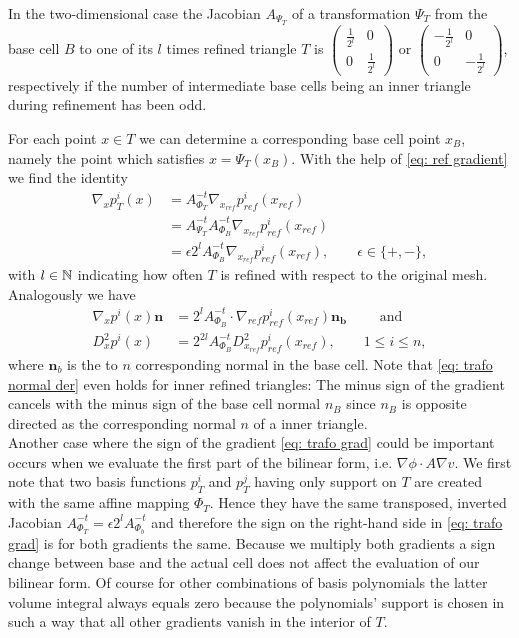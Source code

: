 \begin{example}\label{ex: leaf cell trafo}
In the two-dimensional case the Jacobian $A_{\Psi_T}$ of a transformation $\Psi_T$ from the base cell $B$ to one of its $l$ times refined triangle $T$ is $
	\begin{pmatrix}
		\frac 1 {2^l} & 0 \\ 0 & \frac 1 {2^l}
	\end{pmatrix} \text{ or }
	\begin{pmatrix}
		-\frac 1 {2^l} & 0 \\ 0 & -\frac 1 {2^l}
	\end{pmatrix}$, respectively if the number of intermediate base cells being an inner triangle during refinement  has been odd.

 For each point $x \in T$ we can determine a corresponding base cell point $x_B$, namely the point which satisfies $x = \Psi_T(x_B)$. With the help of \eqref{eq: ref gradient} we find the identity
\begin{align}
\nabla_x p_T^i(x) &= A_{\Phi_T}^{-t} \nabla_{x_{ref}} p^i_{ref} (x_{ref}) \nonumber\\
 &= A_{\Psi_T}^{-t} A_{\Phi_B}^{-t} \nabla_{x_{ref}} p^i_{ref} (x_{ref}) \nonumber\\
&= \epsilon 2^l A_{\Phi_B}^{-t} \nabla_{x_{ref}} p^i_{ref}(x_{ref}), \qquad \epsilon \in \{+,-\} \label{eq: trafo grad},
\end{align}
with $l \in \mathbb{N}$ indicating how often $T$ is refined with respect to the original mesh.\\
Analogously we have
\begin{align}
\nabla_x p^i(x) \mathbf n &= 2^l  A_{\Phi_B}^{-t} \cdot \nabla_{ref}p^i_{ref}(x_{ref}) \mathbf{ n_{b}} \qquad \text{ and } \label{eq: trafo normal der} \\
D_x^2 p^i(x) &= 2^{2l}  A_{\Phi_B}^{-t} D_{x_{ref}}^2 p^i_{ref}(x_{ref}), \qquad 1 \leq i \leq n,
\end{align}
where $\mathbf n_b$ is the to $n$ corresponding normal in the base cell. Note that \eqref{eq: trafo normal der} even holds for inner refined triangles: The minus sign of the gradient cancels with the minus sign of the base cell normal $n_B$ since $n_B$ is opposite directed as the corresponding normal $n$ of a inner triangle.\\
Another case where the sign of the gradient \eqref{eq: trafo grad} could be important occurs when we evaluate the first part of the bilinear form, i.e. $\nabla \phi \cdot A \nabla v$. We first note that two basis functions $p_T^i$ and $p_T^j$ having only support on $T$ are created with the same affine mapping $\Phi_T$. Hence they have the same transposed, inverted Jacobian $A^{-t}_{\Phi_T}=\epsilon 2^l A_{\Phi_b}^{-t}$ and therefore the sign on the right-hand side in \eqref{eq: trafo grad} is for both gradients the same. Because we multiply both gradients a sign change between base and the actual cell does not affect the evaluation of our bilinear form. 
Of course for other combinations of basis polynomials the latter volume integral always equals zero because the polynomials' support is chosen in such a way that all other gradients vanish in the interior of $T$.


\end{example}
